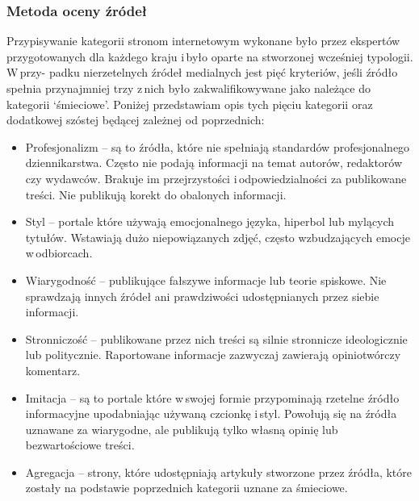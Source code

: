 \subsubsection{Metoda oceny źródeł} \label{metoda-oceny-zrodel}
Przypisywanie kategorii stronom internetowym wykonane było przez ekspertów przygotowanych dla każdego kraju i\,było oparte na stworzonej wcześniej typologii\cite{neudertpolarization2018}. W\,przy- padku nierzetelnych źródeł medialnych jest pięć kryteriów, jeśli źródło spełnia przynajmniej trzy z\,nich było zakwalifikowywane jako należące do kategorii ‘śmieciowe’. Poniżej przedstawiam opis tych pięciu kategorii oraz dodatkowej szóstej będącej zależnej od poprzednich:
\begin{itemize}
    \item Profesjonalizm – są to źródła, które nie spełniają standardów profesjonalnego dziennikarstwa. Często nie podają informacji na temat autorów, redaktorów czy wydawców. Brakuje im przejrzystości i\,odpowiedzialności za publikowane treści. Nie publikują korekt do obalonych informacji.
    \item Styl – portale które używają emocjonalnego języka, hiperbol lub mylących tytułów. Wstawiają dużo niepowiązanych zdjęć, często wzbudzających emocje w\,odbiorcach.
    \item Wiarygodność – publikujące fałszywe informacje lub teorie spiskowe. Nie sprawdzają innych źródeł ani prawdziwości udostępnianych przez siebie informacji.
    \item Stronniczość – publikowane przez nich treści są silnie stronnicze ideologicznie lub politycznie. Raportowane informacje zazwyczaj zawierają opiniotwórczy komentarz.
    \item Imitacja – są to portale które w\,swojej formie przypominają rzetelne źródło informacyjne upodabniając używaną czcionkę i\,styl. Powołują się na źródła uznawane za wiarygodne, ale publikują tylko własną opinię lub bezwartościowe treści.
    \item Agregacja – strony, które udostępniają artykuły stworzone przez źródła, które zostały na podstawie poprzednich kategorii uznane za śmieciowe.
\end{itemize}

